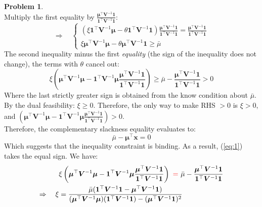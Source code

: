 \documentclass[a4paper, 8pt]{article}
\theoremstyle{definition}
\newtheorem{problem}{Problem}
\theoremstyle{hSol}
\begin{document}
\begin{problem}
\begin{equation}
\end{equation}
Multiply the first equality by $\frac{\bm{\mu}^{\top}\bm{V}^{-1}\bm{1}}{\bm{1}^{\top}\bm{V}^{-1}\bm{1}}$:
\begin{equation}
	\Rightarrow \quad  \begin{cases}
	\left(\xi \bm{1}^{\top}\bm{V}^{-1}\bm{\mu} - \theta \bm{1}^{\top}\bm{V}^{-1}\bm{1}\right)\frac{\bm{\mu}^{\top}\bm{V}^{-1}\bm{1}}{\bm{1}^{\top}\bm{V}^{-1}\bm{1}}  = \frac{\bm{\mu}^{\top}\bm{V}^{-1}\bm{1}}{\bm{1}^{\top}\bm{V}^{-1}\bm{1}}\\
	\xi \bm{\mu}^{\top}\bm{V}^{-1}\bm{\mu} - \theta \bm{\mu}^{\top}\bm{V}^{-1}\bm{1}  \geq \bar{\mu}
	\end{cases}
\end{equation}
The second inequality minus the first \emph{equality} (the sign of the inequality does not change), the terms with $\theta$ cancel out:
\begin{equation}\label{eq:1}
	\xi\left(\bm{\mu}^{\top}\bm{V}^{-1}\bm{\mu} - \bm{1}^{\top}\bm{V}^{-1}\bm{\mu}\frac{\bm{\mu}^{\top}\bm{V}^{-1}\bm{1}}{\bm{1}^{\top}\bm{V}^{-1}\bm{1}}\right) \geq \bar{\mu}  - \frac{\bm{\mu}^{\top}\bm{V}^{-1}\bm{1}}{\bm{1}^{\top}\bm{V}^{-1}\bm{1}} >0
\end{equation}
Where the last strictly greater sign is obtained from the know condition about $\bar{\mu}$. By the dual feasibility: $\xi \geq 0$. Therefore, the only way to make RHS $>0$ is $\xi > 0$, and $\left(\bm{\mu}^{\top}\bm{V}^{-1}\bm{\mu} - \bm{1}^{\top}\bm{V}^{-1}\bm{\mu}\frac{\bm{\mu}^{\top}\bm{V}^{-1}\bm{1}}{\bm{1}^{\top}\bm{V}^{-1}\bm{1}}\right)>0$. \\
Therefore, the complementary slackness equality evaluates to:
\begin{equation}
	\bar{\mu} - \bm{\mu}^{\top} \bm{x} = 0
\end{equation}
Which suggests that the inequality constraint is binding. As a result, (\ref{eq:1}) takes the equal sign. We have:
\begin{equation}
	\begin{split}
		&\xi\left(\bm{\mu}^{\top}\bm{V}^{-1}\bm{\mu} - \bm{1}^{\top}\bm{V}^{-1}\bm{\mu}\frac{\bm{\mu}^{\top}\bm{V}^{-1}\bm{1}}{\bm{1}^{\top}\bm{V}^{-1}\bm{1}}\right)~\textcolor{red}{=}~ \bar{\mu}  - \frac{\bm{\mu}^{\top}\bm{V}^{-1}\bm{1}}{\bm{1}^{\top}\bm{V}^{-1}\bm{1}} \\
		\Rightarrow\quad \xi &= \frac{\bar{\mu}(\bm{1}^{\top}\bm{V}^{-1}\bm{1} - \bm{\mu}^{\top}\bm{V}^{-1}\bm{1})}{(\bm{\mu}^{\top}\bm{V}^{-1}\bm{\mu})(\bm{1}^{\top}\bm{V}^{-1}\bm{1}) - (\bm{\mu}^{\top}\bm{V}^{-1}\bm{1})^2}

\end{split}
\end{equation}
\end{problem}
\end{document}
